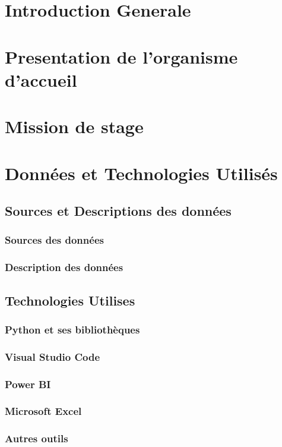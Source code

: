 \newpage
\section{Introduction Generale} 
 
\section{Presentation de l'organisme  d'accueil}

\newpage
\section{Mission de stage}

\section{Données et Technologies Utilisés} 
\subsection{Sources et Descriptions des données}
\subsubsection{Sources des données}
\subsubsection{Description des données}
\subsection{Technologies Utilises}
\subsubsection{Python et ses bibliothèques}
\subsubsection{Visual Studio Code}
\subsubsection{Power BI}
\subsubsection{Microsoft Excel}
\subsubsection{Autres outils} 
